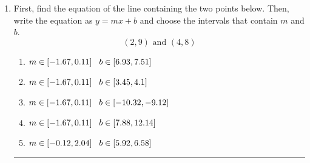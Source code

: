 \documentclass[14pt]{extbook}
\newcommand{\litem}[1]{\item#1\hspace*{-1cm}\rule{\textwidth}{0.4pt}}
\begin{document}
\begin{enumerate}
{\begin{enumerate}[label=\Alph*.]
\end{enumerate} }
\litem{
First, find the equation of the line containing the two points below. Then, write the equation as $ y=mx+b $ and choose the intervals that contain $m$ and $b$.\[ (2, 9) \text{ and } (4, 8) \]\begin{enumerate}[label=\Alph*.]
\item \( m \in [-1.67, 0.11] \hspace*{3mm} b \in [6.93, 7.51] \)
\item \( m \in [-1.67, 0.11] \hspace*{3mm} b \in [3.45, 4.1] \)
\item \( m \in [-1.67, 0.11] \hspace*{3mm} b \in [-10.32, -9.12] \)
\item \( m \in [-1.67, 0.11] \hspace*{3mm} b \in [7.88, 12.14] \)
\item \( m \in [-0.12, 2.04] \hspace*{3mm} b \in [5.92, 6.58] \)

\end{enumerate} }
\end{enumerate}
\end{document}
